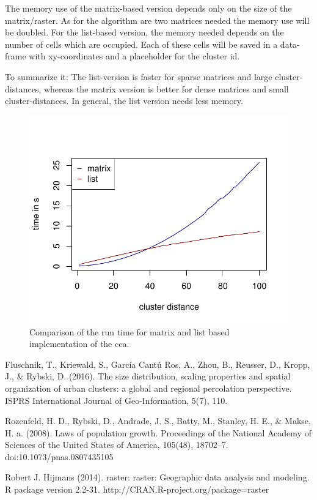 \documentclass[10pt,a4paper]{article}
\begin{document}
The memory use of the matrix-based version depends only on the size of the matrix/raster. As for the algorithm are two matrices needed the memory use will be doubled. For the list-based version, the memory needed depends on the number of cells which are occupied. Each of these cells will be saved in a data-frame with xy-coordinates and a placeholder for the cluster id.

To summarize it: The list-version is faster for sparse matrices and large cluster-distances, whereas the matrix version is better for dense matrices and small cluster-distances. In general, the list version needs less memory.



\begin{figure}
\centering
\includegraphics{compare.pdf}
\caption{Comparison of the run time for matrix and list based implementation of the cca.}
\label{fig:compare}
\end{figure}

\newpage
\begin{thebibliography}{9}

Fluschnik, T., Kriewald, S., García Cantú Ros, A., Zhou, B., Reusser, D., Kropp, J., \& Rybski, D. (2016). The size distribution, scaling properties and spatial organization of urban clusters: a global and regional percolation perspective. ISPRS International Journal of Geo-Information, 5(7), 110.

Rozenfeld, H. D., Rybski, D., Andrade, J. S., Batty, M., Stanley, H. E., \& Makse, H. a. (2008). Laws of population growth. Proceedings of the National Academy of Sciences of the United States of America, 105(48), 18702–7. doi:10.1073/pnas.0807435105

Robert J. Hijmans (2014). raster: raster: Geographic data analysis and modeling. R package version 2.2-31.
  http://CRAN.R-project.org/package=raster
\end{thebibliography}
\end{document}
